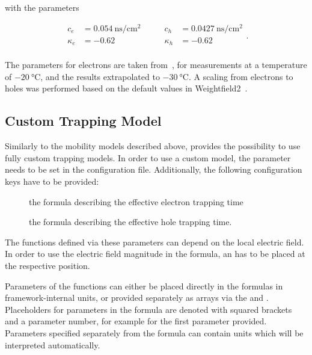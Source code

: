 with the parameters

\begin{equation*}
    \begin{split}
        c_e &= \SI{0.054}{\ns \per \cm^2} \\
        \kappa_e   &= -0.62 \\
    \end{split}
    \qquad
    \begin{split}
        c_h &= \SI{0.0427}{\ns \per \cm^2} \\
        \kappa_h   &= -0.62 \\
    \end{split}.
\end{equation*}

The parameters for electrons are taken from~\cite{Mandic}, for measurements at a temperature of $\SI{-20}{\celsius}$, and the results extrapolated to $\SI{-30}{\celsius}$.
A scaling from electrons to holes was performed based on the default values in Weightfield2~\cite{Weightfield2}.

\cite{Mandic}

\subsection{Custom Trapping Model}

Similarly to the mobility models described above, \apsq provides the possibility to use fully custom trapping models.
In order to use a custom model, the parameter  needs to be set in the configuration file.
Additionally, the following configuration keys have to be provided:
\begin{description}
    \item[] the formula describing the effective electron trapping time
    \item[] the formula describing the effective hole trapping time.
\end{description}

The functions defined via these parameters can depend on the local electric field.
In order to use the electric field magnitude in the formula, an  has to be placed at the respective position.

Parameters of the functions can either be placed directly in the formulas in framework-internal units, or provided separately as arrays via the  and .
Placeholders for parameters in the formula are denoted with squared brackets and a parameter number, for example \parameter{[0]} for the first parameter provided.
Parameters specified separately from the formula can contain units which will be interpreted automatically.

